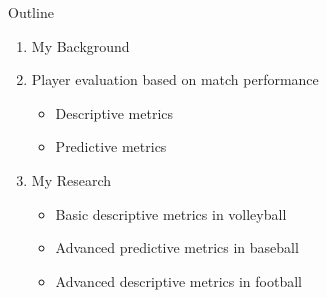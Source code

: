 \documentclass[handout]{beamer}
\begin{document}
\begin{frame}{Outline}
  \begin{enumerate}
    \item {\color{gray} My Background}
    \item Player evaluation based on match performance
    \begin{itemize} 
      \item Descriptive metrics
      \item Predictive metrics
    \end{itemize}
    \item {\color{gray} My Research}
    \begin{itemize}
      \color{gray}
      \item Basic descriptive metrics in volleyball
      \item Advanced predictive metrics in baseball
      \item Advanced descriptive metrics in football
    \end{itemize}
  \end{enumerate}
\end{frame}
\end{document}
